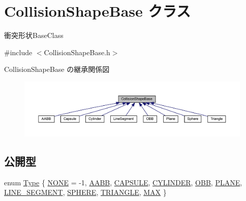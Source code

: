 \hypertarget{class_collision_shape_base}{}\section{Collision\+Shape\+Base クラス}
\label{class_collision_shape_base}


衝突形状\+Base\+Class  




{\ttfamily \#include $<$Collision\+Shape\+Base.\+h$>$}



Collision\+Shape\+Base の継承関係図\nopagebreak
\begin{figure}[H]
\begin{center}
\leavevmode
\includegraphics[width=350pt]{class_collision_shape_base__inherit__graph}
\end{center}
\end{figure}
\subsection*{公開型}
\begin{DoxyCompactItemize}
\item 
enum \mbox{\hyperlink{class_collision_shape_base_a8abcef092855ad0ca191047044b002cb}{Type}} \{ \newline
\mbox{\hyperlink{class_collision_shape_base_a8abcef092855ad0ca191047044b002cba1129630002cc3cf03126a4ef39383c98}{N\+O\+NE}} = -\/1, 
\mbox{\hyperlink{class_collision_shape_base_a8abcef092855ad0ca191047044b002cba2512ecb2c7c72bdbdf8aa3f5a07671c7}{A\+A\+BB}}, 
\mbox{\hyperlink{class_collision_shape_base_a8abcef092855ad0ca191047044b002cba2cae7484589db3e777b158aeae2a633b}{C\+A\+P\+S\+U\+LE}}, 
\mbox{\hyperlink{class_collision_shape_base_a8abcef092855ad0ca191047044b002cba92f81388af31f36357b692f2aead2f19}{C\+Y\+L\+I\+N\+D\+ER}}, 
\newline
\mbox{\hyperlink{class_collision_shape_base_a8abcef092855ad0ca191047044b002cba56e56c8ee634330847018d716ca222b0}{O\+BB}}, 
\mbox{\hyperlink{class_collision_shape_base_a8abcef092855ad0ca191047044b002cba740709eb8c52c5d67d1c9af02af074cf}{P\+L\+A\+NE}}, 
\mbox{\hyperlink{class_collision_shape_base_a8abcef092855ad0ca191047044b002cba8cae4c6afb929fa9a9f3ca67c35f78bd}{L\+I\+N\+E\+\_\+\+S\+E\+G\+M\+E\+NT}}, 
\mbox{\hyperlink{class_collision_shape_base_a8abcef092855ad0ca191047044b002cbaf5cbf5af4d5ef779592f1a293895c63e}{S\+P\+H\+E\+RE}}, 
\newline
\mbox{\hyperlink{class_collision_shape_base_a8abcef092855ad0ca191047044b002cba4b6a6ea5d0152ec22ef54af55a4c872b}{T\+R\+I\+A\+N\+G\+LE}}, 
\mbox{\hyperlink{class_collision_shape_base_a8abcef092855ad0ca191047044b002cba4636454f94c8f39be9fed0b1a3124a2c}{M\+AX}}
 \}
\end{DoxyCompactItemize}
